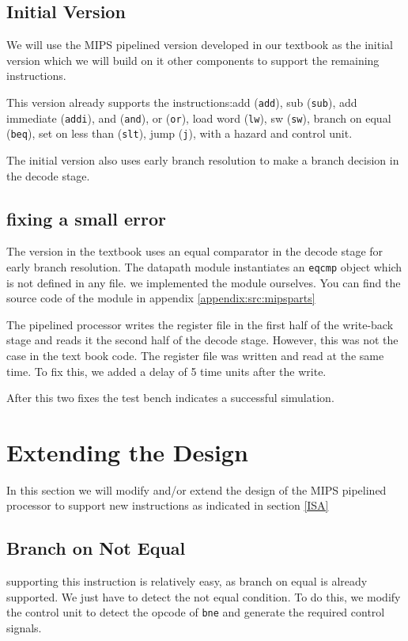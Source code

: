 \documentclass[titlepage,12pt,oneside,a4paper]{article}
\newcommand{\code}[1]{{\texttt{#1}}}
\begin{document}
\subsection{Initial Version}
We will use the MIPS pipelined version developed in our textbook as the initial version which we will build on it other components to support the remaining instructions.

This version already supports the instructions:add (\code{add}), sub (\code{sub}), add immediate (\code{addi}), and (\code{and}), or (\code{or}), load word (\code{lw}), sw (\code{sw}), branch on equal (\code{beq}), set on less than (\code{slt}), jump (\code{j}), with a hazard and control unit.

The initial version also uses early branch resolution to make a branch decision in the decode stage.

\subsection{fixing a small error}

The version in the textbook uses an equal comparator in the decode stage for early branch resolution. The datapath module instantiates an \code{eqcmp} object which is not defined in any file. we implemented the module ourselves. You can find the source code of the module in appendix \ref{appendix:src:mipsparts}

The pipelined processor writes the register file in the first half of the write-back stage and reads it the second half of the decode stage. However, this was not the case in the text book code. The register file was written and read at the same time. To fix this, we added a delay of 5 time units after the write.

After this two fixes the test bench indicates a successful simulation.

\section{Extending the Design}

In this section we will modify and/or extend the design of the MIPS pipelined processor to support new instructions as indicated in section \ref{ISA}

\subsection{Branch on Not Equal}
supporting this instruction is relatively easy, as branch on equal is already supported. We just have to detect the not equal condition. To do this, we modify the control unit to detect the opcode of \code{bne} and generate the required control signals.
\end{document}
